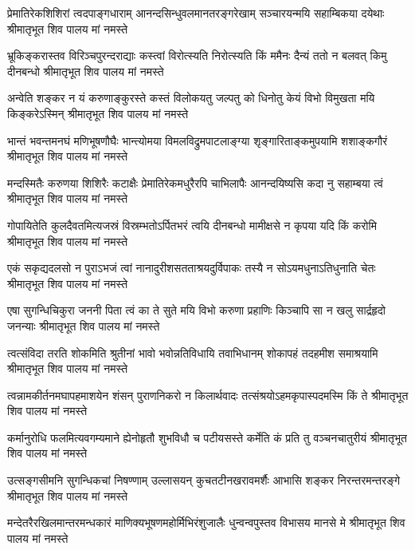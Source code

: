 \fourlineindentedshloka
{प्रेमातिरेकशिशिरां त्वदपाङ्गधाराम्}
{आनन्दसिन्धुवलमानतरङ्गरेखाम्}
{सञ्चारयन्मयि सहाम्बिकया दयेथाः}
{श्रीमातृभूत शिव पालय मां नमस्ते} %

\fourlineindentedshloka
{भ्रूकिङ्करास्तव विरिञ्चपुरन्दराद्याः}
{कस्त्वां विरोत्स्यति निरोत्स्यति किं ममैनः}
{दैन्यं ततो न बलवत् किमु दीनबन्धो}
{श्रीमातृभूत शिव पालय मां नमस्ते} %

\fourlineindentedshloka
{अन्वेति शङ्कर न यं करुणाङ्कुरस्ते}
{कस्तं विलोकयतु जल्पतु को धिनोतु}
{केयं विभो विमुखता मयि किङ्करेऽस्मिन्}
{श्रीमातृभूत शिव पालय मां नमस्ते}  %

\fourlineindentedshloka
{भान्तं भवन्तमनघं मणिभूषणौघैः}
{भान्त्योमया विमलविद्रुमपाटलाङ्ग्या}
{श‍ृङ्गारिताङ्कमुपयामि शशाङ्कगौरं}
{श्रीमातृभूत शिव पालय मां नमस्ते} %

\fourlineindentedshloka
{मन्दस्मितैः करुणया शिशिरैः कटाक्षैः}
{प्रेमातिरेकमधुरैरपि चाभिलापैः}
{आनन्दयिष्यसि कदा नु सहाम्बया त्वं}
{श्रीमातृभूत शिव पालय मां नमस्ते} %

\fourlineindentedshloka
{गोपायितेति कुलदैवतमित्यजस्रं}
{विस्रम्भतोऽर्पितभरं त्वयि दीनबन्धो}
{मामीक्षसे न कृपया यदि किं करोमि}
{श्रीमातृभूत शिव पालय मां नमस्ते} %

\fourlineindentedshloka
{एकं सकृद्यदलसो न पुराऽभजं त्वां}
{नानादुरीशसतताश्रयदुर्विपाकः}
{तस्यै न सोऽयमधुनाऽतिधुनाति चेतः}
{श्रीमातृभूत शिव पालय मां नमस्ते} %

\fourlineindentedshloka
{एषा सुगन्धिचिकुरा जननी पिता त्वं}
{का ते सुते मयि विभो करुणा प्रहाणिः}
{किञ्चापि सा न खलु सार्द्रहृदो जनन्याः}
{श्रीमातृभूत शिव पालय मां नमस्ते} %

\fourlineindentedshloka
{त्वत्संविदा तरति शोकमिति श्रुतीनां}
{भावो भवोन्नतिविधायि तवाभिधानम्}
{शोकापहं तदहमीश समाश्रयामि}
{श्रीमातृभूत शिव पालय मां नमस्ते} %

\fourlineindentedshloka
{त्वन्नामकीर्तनमघापहमाशयेन}
{शंसन् पुराणनिकरो न किलार्थवादः}
{तत्संश्रयोऽहमकृपास्पदमस्मि किं ते}
{श्रीमातृभूत शिव पालय मां नमस्ते} %

\fourlineindentedshloka
{कर्मानुरोधि फलमित्यवगम्यमाने}
{ह्येनोहृतौ शुभविधौ च पटीयसस्ते}
{कर्मेति कं प्रति तु वञ्चनचातुरीयं}
{श्रीमातृभूत शिव पालय मां नमस्ते} %

\fourlineindentedshloka
{उत्सङ्गसीमनि सुगन्धिकचां निषण्णाम्}
{उल्लासयन् कुचतटीनखरावमर्शैः}
{आभासि शङ्कर निरन्तरमन्तरङ्गे}
{श्रीमातृभूत शिव पालय मां नमस्ते} %

\fourlineindentedshloka
{मन्देतरैरखिलमान्तरमन्धकारं}
{माणिक्यभूषणमहोर्मिभिरंशुजालैः}
{धुन्वन्वपुस्तव विभासय मानसे मे}
{श्रीमातृभूत शिव पालय मां नमस्ते} %

